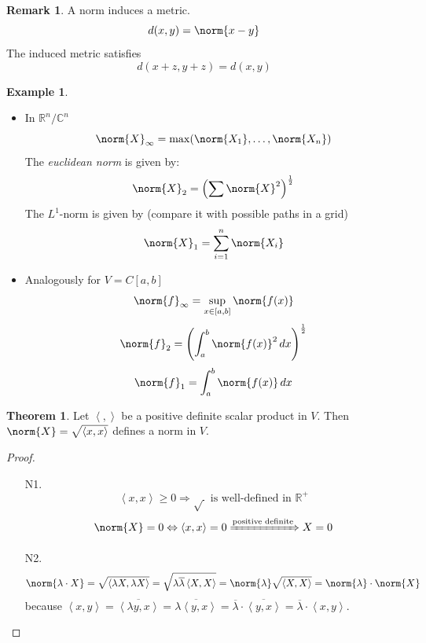 \documentclass[a4paper,landscape,twocolumn]{article}
\newcommand\functional[1]{\left\langle{#1}\right\rangle}
\theoremstyle{definition}
\newtheorem{theorem}{Theorem}
\newtheorem{ex}{Example}
\newtheorem{rem}{Remark}
\DeclarePairedDelimiter\norm\lVert\rVert
\begin{document}
\begin{rem}
  \label{rem-8.17}
  A norm induces a metric.
  \[ d(x,y) = \norm{x - y} \]
  The induced metric satisfies
  \[ d(x+z, y+z) = d(x,y) \]
\end{rem}

\begin{ex}
  \label{example-8.18}
  \begin{itemize}
    \item
      In $\mathbb R^n/\mathbb C^n$
      \[ \norm{X}_{\infty} = \max(\norm{X_1}, \ldots, \norm{X_n}) \]
      The \emph{euclidean norm} is given by:
      \[ \norm{X}_2 = \left(\sum \norm{X}^2\right)^{\frac 12} \]
      The $L^1$-norm is given by (compare it with possible paths in a grid)
      \[ \norm{X}_1 = \sum_{i=1}^n \norm{X_i} \]
    \item
      Analogously for $V = C[a,b]$
        \[ \norm{f}_{\infty} = \sup_{x \in [a,b]} \norm{f(x)} \]
        \[ \norm{f}_2 = \left(\int_a^b \norm{f(x)}^2 \, dx\right)^{\frac 12} \]
        \[ \norm{f}_1 = \int_a^b \norm{f(x)} \, dx \]
  \end{itemize}
\end{ex}

\begin{theorem}
  \label{satz-8.19}
  Let $\functional{,}$ be a positive definite scalar product in $V$.
  Then $\norm{X} = \sqrt{\functional{x,x}}$ defines a norm in $V$.
\end{theorem}
\begin{proof}
  \begin{enumerate}
    \item[N1.]
      \[ \functional{x,x} \geq 0 \Rightarrow \sqrt{\,} \text{ is  well-defined in } \mathbb R^+ \]
      \[ \norm{X} = 0 \Leftrightarrow \functional{x,x} = 0 \xRightarrow{\text{positive definite}} X = 0  \]
    \item[N2.]
      \[
        \norm{\lambda \cdot X} = \sqrt{\functional{\lambda X, \lambda X}}
        = \sqrt{\lambda \overline{\lambda} \functional{X,X}}
        = \norm{\lambda} \sqrt{\functional{X,X}}
        = \norm{\lambda} \cdot \norm{X}
      \]
      because $\functional{x,y} = \overline{\functional{\lambda y, x}} = \overline{\lambda \functional{y,x}} = \overline{\lambda} \cdot \overline{\functional{y,x}} = \overline{\lambda} \cdot \functional{x,y}$.
  \end{enumerate}
\end{proof}
\end{document}
